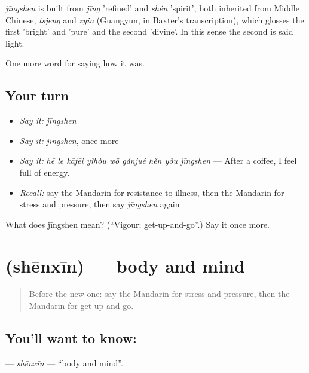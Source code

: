 \begin{cousinweb}
\emph{jīngshen} is built from \emph{jīng} 'refined' and \emph{shén} 'spirit', both inherited from Middle Chinese, \emph{tsjeng} and \emph{zyin} (Guangyun, in Baxter's transcription), which glosses the first 'bright' and 'pure' and the second 'divine'. In this sense the second is said light.
\end{cousinweb}

\begin{grammarlens}[title={What you've built}]
One more word for saying how it was.
\end{grammarlens}

\subsection*{Your turn}
\begin{itemize}
\raggedright
  \item \emph{Say it:} \emph{jīngshen}
  \item \emph{Say it:} \emph{jīngshen}, once more
  \item \emph{Say it:} \emph{hē le kāfēi yǐhòu wǒ gǎnjué hěn yǒu jīngshen} — After a coffee, I feel full of energy.
  \item \emph{Recall:} say the Mandarin for resistance to illness, then the Mandarin for stress and pressure, then say \emph{jīngshen} again
\end{itemize}

\begin{tcolorbox}[breakable,colback=teal!4,colframe=teal!35!black,title={Before you move on}]
What does jīngshen mean? (\textquotedblleft{}Vigour; get-up-and-go\textquotedblright{}.) Say it once more.
\end{tcolorbox}
\section[\texorpdfstring{\zh{身心} (shēnxīn)}{身心 (shēnxīn)}]{ (shēnxīn) — body and mind}

\label{lesson:ZH-C485-shenxin}



\begin{quote}
Before the new one: say the Mandarin for stress and pressure, then the Mandarin for get-up-and-go.
\end{quote}

\subsection*{You'll want to know: }
\textbf{} — \emph{shēnxīn} — \textquotedblleft{}body and mind\textquotedblright{}.

